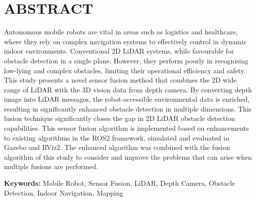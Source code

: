 \section*{ABSTRACT}
Autonomous mobile robots are vital in areas such as logistics and healthcare, where they rely on complex navigation systems to effectively control in dynamic indoor environments. Conventional 2D LiDAR systems, while favourable for obstacle detection in a single plane. However, they perform poorly in recognising low-lying and complex obstacles, limiting their operational efficiency and safety.
This study presents a novel sensor fusion method that combines the 2D wide range of LiDAR with the 3D vision data from depth camera. By converting depth image into LiDAR messages, the robot-accessible environmental data is enriched, resulting in significantly enhanced obstacle detection in multiple dimensions. This fusion technique significantly closes the gap in 2D LiDAR obstacle detection capabilities.
This sensor fusion algorithm is implemented based on enhancements to existing algorithms in the ROS2 framework, simulated and evaluated in Gazebo and RViz2. The enhanced algorithm was combined with the fusion algorithm of this study to consider and improve the problems that can arise when multiple fusions are performed.
\vspace{0.5cm}

\textbf{Keywords:} Mobile Robot, Sensor Fusion, LiDAR, Depth Camera, Obstacle Detection, Indoor Navigation, Mapping

\vspace{0.5cm}
